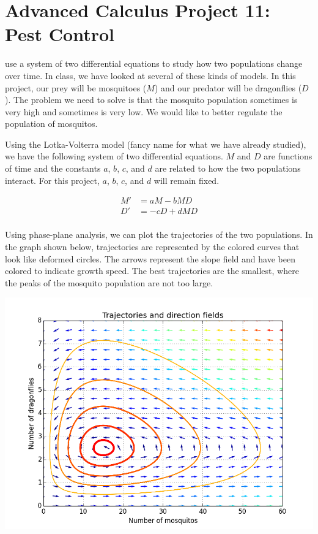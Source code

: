 \documentclass
[justified,nohyper]
{tufte-handout}
\begin{document}
\section{Advanced Calculus Project 11: Pest Control}

 use a system of two differential equations to study how two populations change over time. In class, we have looked at several of these kinds of models. In this project, our prey will be mosquitoes ($M$) and our predator will be dragonflies ($D$). The problem we need to solve is that the mosquito population sometimes is very high and sometimes is very low. We would like to better regulate the population of mosquitos.

Using the Lotka-Volterra model (fancy name for what we have already studied), we have the following system of two differential equations. $M$ and $D$ are functions of time and the constants $a$, $b$, $c$, and $d$ are related to how the two populations interact. For this project, $a$, $b$, $c$, and $d$ will remain fixed.

\begin{align*}
    M' &= aM - bMD \\
    D' &= -cD +dMD \\
\end{align*}

Using phase-plane analysis, we can plot the trajectories of the two populations. In the graph shown below, trajectories are represented by the colored curves that look like deformed circles. The arrows represent the slope field and have been colored to indicate growth speed. The best trajectories are the smallest, where the peaks of the mosquito population are not too large.

\includegraphics[scale=0.5]{field_mosquitos_and_dragonflies.png}
\end{document}
